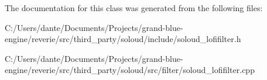 The documentation for this class was generated from the following files\+:\begin{DoxyCompactItemize}
\item 
C\+:/\+Users/dante/\+Documents/\+Projects/grand-\/blue-\/engine/reverie/src/third\+\_\+party/soloud/include/soloud\+\_\+lofifilter.\+h\item 
C\+:/\+Users/dante/\+Documents/\+Projects/grand-\/blue-\/engine/reverie/src/third\+\_\+party/soloud/src/filter/soloud\+\_\+lofifilter.\+cpp\end{DoxyCompactItemize}
